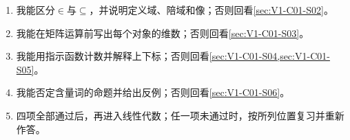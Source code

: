 \begin{SLCompactClosure}
\label{schema:V1-C01:CH-36}

\begin{selfcheckbox}\label{schema:V1-C01:CH-37}
\begin{enumerate}[leftmargin=2em]
  \item 我能区分$\in$与$\subseteq$，并说明定义域、陪域和像；否则回看\cref{sec:V1-C01-S02}。
  \item 我能在矩阵运算前写出每个对象的维数；否则回看\cref{sec:V1-C01-S03}。
  \item 我能用指示函数计数并解释上下标；否则回看\cref{sec:V1-C01-S04,sec:V1-C01-S05}。
  \item 我能否定含量词的命题并给出反例；否则回看\cref{sec:V1-C01-S06}。
  \item 四项全部通过后，再进入线性代数；任一项未通过时，按所列位置复习并重新作答。
\end{enumerate}
\end{selfcheckbox}
\end{SLCompactClosure}
